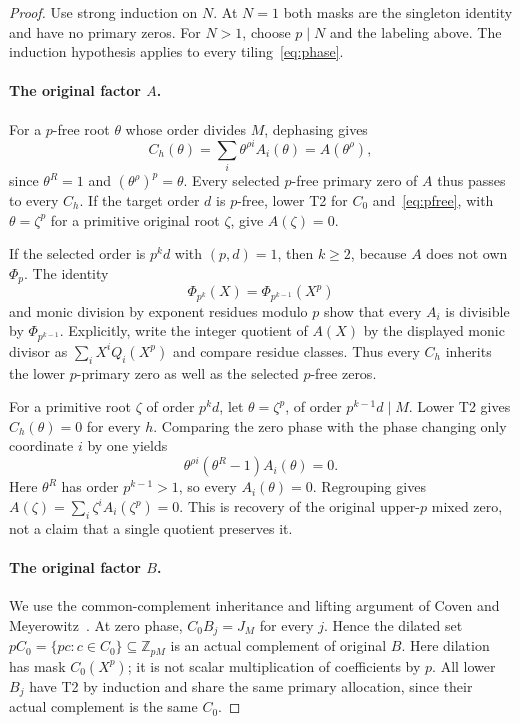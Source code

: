 \documentclass[10pt,a4paper]{amsart}
\newcommand{\Z}{\mathbb Z}
\newcommand{\PhiC}{\Phi}
\begin{document}
\begin{proof}
Use strong induction on $N$. At $N=1$ both masks are the singleton identity and have no primary zeros. For $N>1$, choose $p\mid N$ and the labeling above. The induction hypothesis applies to every tiling~\eqref{eq:phase}.

\paragraph{The original factor $A$.}
For a $p$-free root $\theta$ whose order divides $M$, dephasing gives
\begin{equation}\label{eq:pfree}
 C_h(\theta)=\sum_i\theta^{\rho i}A_i(\theta)=A(\theta^\rho),
\end{equation}
since $\theta^R=1$ and $(\theta^\rho)^p=\theta$. Every selected $p$-free primary zero of $A$ thus passes to every $C_h$. If the target order $d$ is $p$-free, lower T2 for $C_0$ and~\eqref{eq:pfree}, with $\theta=\zeta^p$ for a primitive original root $\zeta$, give $A(\zeta)=0$.

If the selected order is $p^kd$ with $(p,d)=1$, then $k\ge2$, because $A$ does not own $\PhiC_p$. The identity
\[
 \PhiC_{p^k}(X)=\PhiC_{p^{k-1}}(X^p)
\]
and monic division by exponent residues modulo $p$ show that every $A_i$ is divisible by $\PhiC_{p^{k-1}}$. Explicitly, write the integer quotient of $A(X)$ by the displayed monic divisor as $\sum_iX^iQ_i(X^p)$ and compare residue classes. Thus every $C_h$ inherits the lower $p$-primary zero as well as the selected $p$-free zeros.

For a primitive root $\zeta$ of order $p^kd$, let $\theta=\zeta^p$, of order $p^{k-1}d\mid M$. Lower T2 gives $C_h(\theta)=0$ for every $h$. Comparing the zero phase with the phase changing only coordinate $i$ by one yields
\[
 \theta^{\rho i}(\theta^R-1)A_i(\theta)=0.
\]
Here $\theta^R$ has order $p^{k-1}>1$, so every $A_i(\theta)=0$. Regrouping gives $A(\zeta)=\sum_i\zeta^i A_i(\zeta^p)=0$. This is recovery of the original upper-$p$ mixed zero, not a claim that a single quotient preserves it.

\paragraph{The original factor $B$.}
We use the common-complement inheritance and lifting argument of Coven and Meyerowitz~\cite[Lemma~2.5]{CM}.
At zero phase, $C_0B_j=J_M$ for every $j$. Hence the dilated set $pC_0=\{pc:c\in C_0\}\subseteq\Z_{pM}$ is an actual complement of original $B$. Here dilation has mask $C_0(X^p)$; it is not scalar multiplication of coefficients by $p$. All lower $B_j$ have T2 by induction and share the same primary allocation, since their actual complement is the same $C_0$.


\end{proof}
\end{document}
